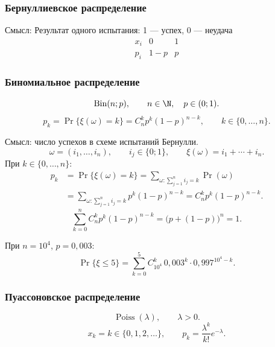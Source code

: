 \subsubsection{Бернуллиевское распределение}

\begin{definition}
    Смысл: Результат одного испытания: 1 — успех, 0 — неудача
    \[
        \begin{array}{c|cc}
            x_i & 0 & 1\\\hline
            p_i & 1-p & p
        \end{array}
    \]
\end{definition}

\subsubsection{Биномиальное распределение}

\begin{definition}
    \[
        \operatorname{Bin}(n;p),\qquad n\in\N,\quad p\in(0;1).
    \]
    \[
        p_k=\Pr\{\xi(\omega)=k\}=C_n^k p^k(1-p)^{n-k},
        \qquad k\in\{0,\ldots,n\}.
    \]
\end{definition}

Смысл: число успехов в схеме испытаний Бернулли.
\[
    \omega=(i_1,\ldots,i_n),\qquad i_j\in\{0;1\},
    \qquad \xi(\omega)=i_1+\cdots+i_n.
\]
При $k\in\{0,\ldots,n\}$:
\[
    \begin{aligned}
        p_k&=\Pr\{\xi(\omega)=k\}
        =\sum_{\omega\colon\sum_{j=1}^{n}i_j=k}\Pr(\omega)\\
        &=\sum_{\omega\colon\sum_{j=1}^{n}i_j=k}
          p^k(1-p)^{n-k}
        =C_n^k p^k(1-p)^{n-k}.
    \end{aligned}
\]
\[
    \sum_{k=0}^{n}C_n^k p^k(1-p)^{n-k}
    =\bigl(p+(1-p)\bigr)^n=1.
\]

\begin{example}
    При $n=10^4$, $p=0{,}003$:
    \[
        \Pr\{\xi\leq5\}
        =\sum_{k=0}^{5}C_{10^4}^k\,
        0{,}003^k\cdot0{,}997^{10^4-k}.
    \]
\end{example}

\subsubsection{Пуассоновское распределение}

\begin{definition}
    \[
        \operatorname{Poiss}(\lambda),\qquad\lambda>0.
    \]
    \[
        x_k=k\in\{0,1,2,\ldots\},\qquad
        p_k=\frac{\lambda^k}{k!}e^{-\lambda}.
    \]
\end{definition}


